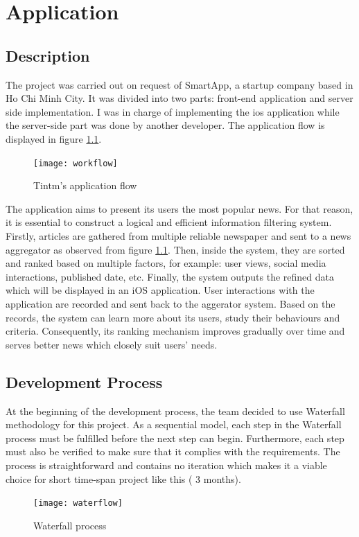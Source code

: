 \documentclass[11pt,a4paper,oneside,article]{memoir}
\begin{document}
\newpage
\chapter{Application}

\section{Description}

The project was carried out on request of SmartApp, a startup company based in Ho Chi Minh City. It was divided into two parts: front-end application and server side implementation. I was in charge of implementing the \gls{ios} application while the server-side part was done by another developer. The application flow is displayed in figure \ref{fig:workflow}.

\begin{figure}[h]

\centering
\texttt{[image: workflow]}

\caption{Tintm's application flow}
\label{fig:workflow}

\end{figure}

The application aims to present its users the most popular news. For that reason, it is essential to construct a logical and efficient information filtering system. Firstly, articles are gathered from multiple reliable newspaper and sent to a news aggregator as observed from figure \ref{fig:workflow}. Then, inside the system, they are sorted and ranked based on multiple factors, for example: user views, social media interactions, published date, etc. Finally, the system outputs the refined data which will be displayed in an \gls{iOS} application. User interactions with the application are recorded and sent back to the aggerator system. Based on the records, the system can learn more about its users, study their behaviours and criteria. Consequently, its ranking mechanism improves gradually over time and serves better news which closely suit users' needs. 

\section{Development Process}
At the beginning of the development process, the team decided to use Waterfall methodology for this project. As a sequential model, each step in the Waterfall process must be fulfilled before the next step can begin. Furthermore, each step must also be verified to make sure that it complies with the requirements.\cite{waterfall:rumania} The process is straightforward and contains no iteration which makes it a viable choice for short time-span project like this ( 3 months). 
\begin{figure}[H]

\centering
\texttt{[image: waterflow]}

\caption{Waterfall process}
\label{fig:waterfall}

\end{figure}
\end{document}

